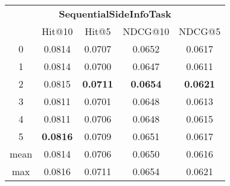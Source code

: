 \documentclass{article}
\begin{document}
 

\begin{tabular}{c|cccc}

\multicolumn{5}{c}{\textbf{SequentialSideInfoTask}} \\
\noalign{\smallskip}
\noalign{\smallskip}
\toprule
\multicolumn{1}{c}{Template ID}	&	\multicolumn{1}{|c}{Hit@10}	&	\multicolumn{1}{c}{Hit@5}	&	\multicolumn{1}{c}{NDCG@10}	&	\multicolumn{1}{c}{NDCG@5}\\
\midrule
0	&	0.0814	&	0.0707	&	0.0652	&	0.0617\\
1	&	0.0814	&	0.0700	&	0.0647	&	0.0611\\
2	&	0.0815	&	\textbf{0.0711}	&	\textbf{0.0654}	&	\textbf{0.0621}\\
3	&	0.0811	&	0.0701	&	0.0648	&	0.0613\\
4	&	0.0811	&	0.0706	&	0.0648	&	0.0615\\
5	&	\textbf{0.0816}	&	0.0709	&	0.0651	&	0.0617\\
\midrule
mean	&	0.0814	&	0.0706	&	0.0650	&	0.0616\\
max	&	0.0816	&	0.0711	&	0.0654	&	0.0621\\
\bottomrule

\end{tabular}
\end{document}
